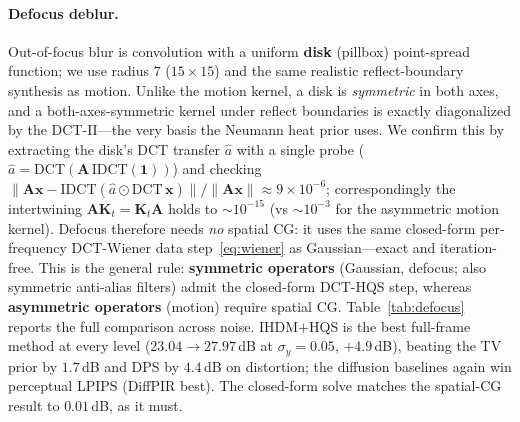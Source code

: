 \documentclass[11pt]{article}
\newcommand{\A}{\mathbf{A}}
\newcommand{\K}{\mathbf{K}}
\newcommand{\x}{\mathbf{x}}
\begin{document}
\paragraph{Defocus deblur.}
Out-of-focus blur is convolution with a uniform \textbf{disk} (pillbox) point-spread function; we
use radius $7$ ($15\times15$) and the same realistic reflect-boundary synthesis as motion. Unlike
the motion kernel, a disk is \emph{symmetric} in both axes, and a both-axes-symmetric kernel under
reflect boundaries is exactly diagonalized by the DCT-II---the very basis the Neumann heat prior
uses. We confirm this by extracting the disk's DCT transfer $\hat a$ with a single probe
($\hat a=\mathrm{DCT}(\A\,\mathrm{IDCT}(\mathbf 1))$) and checking
$\lVert\A\x-\mathrm{IDCT}(\hat a\odot\mathrm{DCT}\,\x)\rVert/\lVert\A\x\rVert\approx9\times10^{-6}$;
correspondingly the intertwining $\A\K_t=\K_t\A$ holds to $\sim\!10^{-15}$ (vs $\sim\!10^{-3}$ for
the asymmetric motion kernel). Defocus therefore needs \emph{no} spatial CG: it uses the same
closed-form per-frequency DCT-Wiener data step~\eqref{eq:wiener} as Gaussian---exact and
iteration-free. This is the general rule: \textbf{symmetric operators} (Gaussian, defocus; also
symmetric anti-alias filters) admit the closed-form DCT-HQS step, whereas \textbf{asymmetric
operators} (motion) require spatial CG. Table~\ref{tab:defocus} reports the full comparison across
noise. IHDM$+$HQS is the best full-frame method at every level ($23.04\!\to\!27.97$\,dB at
$\sigma_y=0.05$, $+4.9$\,dB), beating the TV prior by $1.7$\,dB and DPS by $4.4$\,dB on distortion;
the diffusion baselines again win perceptual LPIPS (DiffPIR best). The closed-form solve matches the spatial-CG result to
$0.01$\,dB, as it must.
\end{document}
